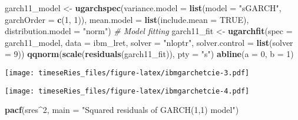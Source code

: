 \documentclass[]{book}
\newenvironment{Shaded}{\begin{snugshade}}{\end{snugshade}}
\newcommand{\KeywordTok}[1]{\textcolor[rgb]{0.13,0.29,0.53}{\textbf{#1}}}
\newcommand{\DataTypeTok}[1]{\textcolor[rgb]{0.13,0.29,0.53}{#1}}
\newcommand{\DecValTok}[1]{\textcolor[rgb]{0.00,0.00,0.81}{#1}}
\newcommand{\StringTok}[1]{\textcolor[rgb]{0.31,0.60,0.02}{#1}}
\newcommand{\CommentTok}[1]{\textcolor[rgb]{0.56,0.35,0.01}{\textit{#1}}}
\newcommand{\OtherTok}[1]{\textcolor[rgb]{0.56,0.35,0.01}{#1}}
\newcommand{\OperatorTok}[1]{\textcolor[rgb]{0.81,0.36,0.00}{\textbf{#1}}}
\newcommand{\NormalTok}[1]{#1}
\begin{document}
\begin{Shaded}
\begin{Highlighting}[]
\NormalTok{garch11_model <-}\StringTok{ }\KeywordTok{ugarchspec}\NormalTok{(}\DataTypeTok{variance.model =} \KeywordTok{list}\NormalTok{(}\DataTypeTok{model =} \StringTok{"sGARCH"}\NormalTok{, }\DataTypeTok{garchOrder =} \KeywordTok{c}\NormalTok{(}\DecValTok{1}\NormalTok{, }
    \DecValTok{1}\NormalTok{)), }\DataTypeTok{mean.model =} \KeywordTok{list}\NormalTok{(}\DataTypeTok{include.mean =} \OtherTok{TRUE}\NormalTok{), }\DataTypeTok{distribution.model =} \StringTok{"norm"}\NormalTok{)}
\CommentTok{# Model fitting}
\NormalTok{garch11_fit <-}\StringTok{ }\KeywordTok{ugarchfit}\NormalTok{(}\DataTypeTok{spec =}\NormalTok{ garch11_model, }\DataTypeTok{data =}\NormalTok{ ibm_lret, }\DataTypeTok{solver =} \StringTok{"nloptr"}\NormalTok{, }
    \DataTypeTok{solver.control =} \KeywordTok{list}\NormalTok{(}\DataTypeTok{solver =} \DecValTok{9}\NormalTok{))}
\KeywordTok{qqnorm}\NormalTok{(}\KeywordTok{scale}\NormalTok{(}\KeywordTok{residuals}\NormalTok{(garch11_fit)), }\DataTypeTok{pty =} \StringTok{"s"}\NormalTok{)}
\KeywordTok{abline}\NormalTok{(}\DataTypeTok{a =} \DecValTok{0}\NormalTok{, }\DataTypeTok{b =} \DecValTok{1}\NormalTok{)}
\end{Highlighting}
\end{Shaded}

\texttt{[image: timeseRies\_files/figure-latex/ibmgarchetcie-3.pdf]}

\begin{Shaded}
\end{Shaded}

\texttt{[image: timeseRies\_files/figure-latex/ibmgarchetcie-4.pdf]}

\begin{Shaded}
\begin{Highlighting}[]
\KeywordTok{pacf}\NormalTok{(sres}\OperatorTok{^}\DecValTok{2}\NormalTok{, }\DataTypeTok{main =} \StringTok{"Squared residuals of GARCH(1,1) model"}\NormalTok{)}
\end{Highlighting}
\end{Shaded}
\end{document}
